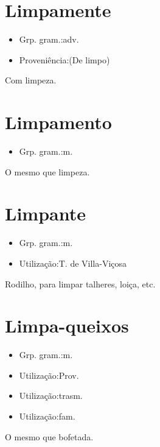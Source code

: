 \section{Limpamente}
\begin{itemize}
\item {Grp. gram.:adv.}
\end{itemize}
\begin{itemize}
\item {Proveniência:(De \textunderscore limpo\textunderscore )}
\end{itemize}
Com limpeza.
\section{Limpamento}
\begin{itemize}
\item {Grp. gram.:m.}
\end{itemize}
O mesmo que \textunderscore limpeza\textunderscore .
\section{Limpante}
\begin{itemize}
\item {Grp. gram.:m.}
\end{itemize}
\begin{itemize}
\item {Utilização:T. de Villa-Viçosa}
\end{itemize}
Rodilho, para limpar talheres, loiça, etc.
\section{Limpa-queixos}
\begin{itemize}
\item {Grp. gram.:m.}
\end{itemize}
\begin{itemize}
\item {Utilização:Prov.}
\end{itemize}
\begin{itemize}
\item {Utilização:trasm.}
\end{itemize}
\begin{itemize}
\item {Utilização:fam.}
\end{itemize}
O mesmo que \textunderscore bofetada\textunderscore .
